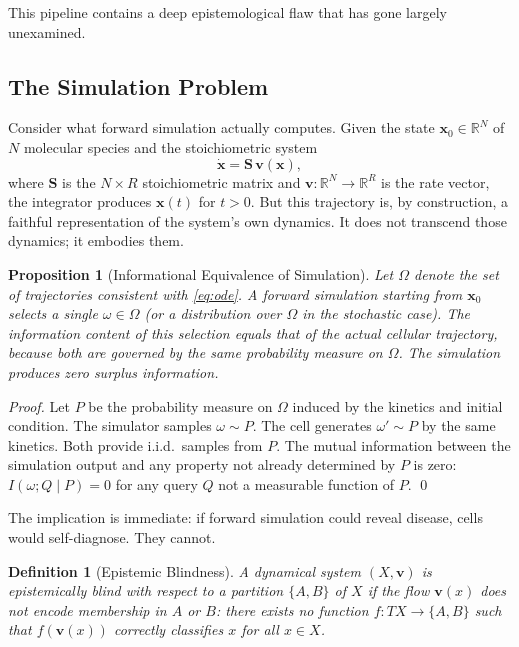 \documentclass[11pt,twocolumn,a4paper]{article}
\newtheorem{proposition}[theorem]{Proposition}
\newtheorem{definition}[theorem]{Definition}
\newcommand{\R}{\mathbb{R}}
\begin{document}
This pipeline contains a deep epistemological flaw that has gone
largely unexamined.

\subsection{The Simulation Problem}

Consider what forward simulation actually computes.  Given the state
$\mathbf{x}_0 \in \R^N$ of $N$ molecular species and the
stoichiometric system
\begin{equation}
  \dot{\mathbf{x}} = \mathbf{S}\,\mathbf{v}(\mathbf{x}),
  \label{eq:ode}
\end{equation}
where $\mathbf{S}$ is the $N \times R$ stoichiometric matrix and
$\mathbf{v} : \R^N \to \R^R$ is the rate vector, the integrator
produces $\mathbf{x}(t)$ for $t > 0$.  But this trajectory is, by
construction, a faithful representation of the system's own dynamics.
It does not transcend those dynamics; it embodies them.

\begin{proposition}[Informational Equivalence of Simulation]
\label{prop:sim-equiv}
Let $\Omega$ denote the set of trajectories consistent with
\eqref{eq:ode}.  A forward simulation starting from $\mathbf{x}_0$
selects a single $\omega \in \Omega$ (or a distribution over $\Omega$
in the stochastic case).  The information content of this selection
equals that of the actual cellular trajectory, because both are
governed by the same probability measure on $\Omega$.  The simulation
produces zero surplus information.
\end{proposition}

\begin{proof}
Let $P$ be the probability measure on $\Omega$ induced by the kinetics
and initial condition.  The simulator samples $\omega \sim P$.  The
cell generates $\omega' \sim P$ by the same kinetics.  Both provide
i.i.d.\ samples from $P$.  The mutual information between the
simulation output and any property not already determined by $P$ is
zero:
$I(\omega; Q \mid P) = 0$ for any query $Q$ not a measurable function
of $P$.  \qed
\end{proof}

The implication is immediate: if forward simulation could reveal
disease, cells would self-diagnose.  They cannot.

\begin{definition}[Epistemic Blindness]
\label{def:blind}
A dynamical system $(X, \mathbf{v})$ is \emph{epistemically blind}
with respect to a partition $\{A, B\}$ of $X$ if the flow
$\mathbf{v}(x)$ does not encode membership in $A$ or $B$: there
exists no function $f : TX \to \{A, B\}$ such that $f(\mathbf{v}(x))$
correctly classifies $x$ for all $x \in X$.
\end{definition}
\end{document}
